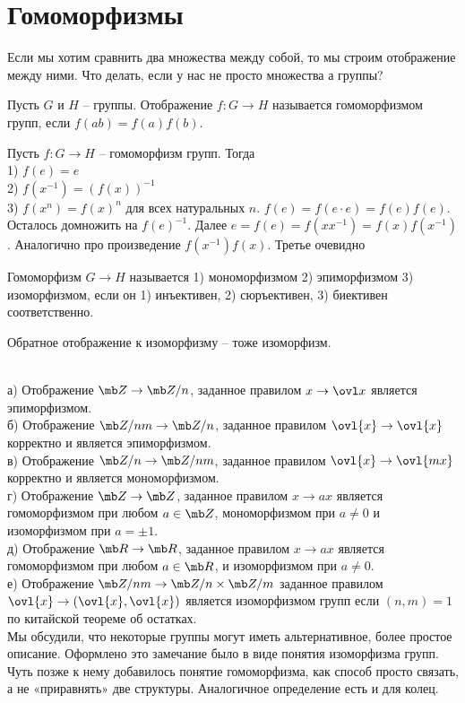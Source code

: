 \section{Гомоморфизмы}

Если мы хотим сравнить два множества между собой, то мы строим отображение между ними. Что делать, если у нас не просто множества а группы?

\dfn[Гомоморфизм] Пусть $G$ и $H$ -- группы. Отображение $f\colon G\to H$ называется гомоморфизмом групп, если $f(ab)=f(a)f(b)$. 
\edfn

\lm[Свойства] Пусть $f\colon G \to H$ -- гомоморфизм групп. Тогда\\
1) $f(e)=e$\\
2) $f(x^{-1})=(f(x))^{-1}$\\
3) $f(x^n)=f(x)^n$ для всех натуральных $n$.
\proof $f(e)=f(e\cdot e)=f(e)f(e)$. Осталось домножить на $f(e)^{-1}$.
Далее $e=f(e)=f(xx^{-1})=f(x)f(x^{-1})$. Аналогично про произведение $f(x^{-1})f(x)$. Третье очевидно
\endproof
\elm

\dfn[Изоморфизм] Гомоморфизм $G\to H$ называется 1) мономорфизмом 2) эпиморфизмом 3) изоморфизмом, если он 1) инъективен, 2) сюръективен, 3) биективен соответственно.
\edfn

\rm Обратное отображение к изоморфизму -- тоже изоморфизм.
\erm

\exm\\
а) Отображение $\mb Z \to\mb Z/n$, заданное правилом $x\to \ovl x$ является эпиморфизмом.\\
б) Отображение $\mb Z/nm \to \mb Z/n$, заданное правилом $\ovl{x} \to \ovl{x}$ корректно и является эпиморфизмом.\\
в) Отображение $\mb Z/n \to \mb Z/nm$, заданное правилом $\ovl{x}\to \ovl{mx}$ корректно и является мономорфизмом.\\
г)  Отображение $\mb Z \to \mb Z$, заданное правилом $x \to ax$ является гомоморфизмом при любом $a\in \mb Z$, мономорфизмом при $a\neq 0$ и изоморфизмом при $a=\pm 1$.\\
д)  Отображение $\mb R \to \mb R$, заданное правилом $x \to ax$ является гомоморфизмом при любом $a\in \mb R$,  и изоморфизмом при $a\neq 0$.\\
е) Отображение $\mb Z/nm \to\mb Z/n\times \mb Z/m$ заданное правилом $\ovl{x}\to (\ovl{x},\ovl{x})$ является изоморфизмом групп если $(n,m)=1$ по китайской теореме об остатках.\\



Мы обсудили, что некоторые группы могут иметь альтернативное, более простое описание. Оформлено это замечание было в виде понятия изоморфизма групп. Чуть позже к нему добавилось понятие гомоморфизма, как способ просто связать, а не «приравнять» две структуры. Аналогичное определение есть и для колец.

